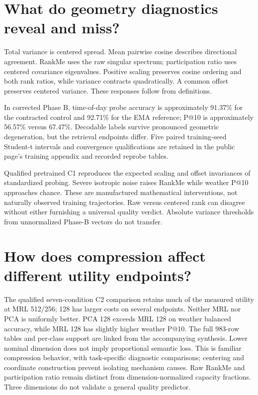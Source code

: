 \documentclass[11pt]{article}
\begin{document}
\section{What do geometry diagnostics reveal and miss?}
\established{} Total variance is centered spread. Mean pairwise cosine describes
directional agreement. RankMe \citep{garrido2023rankme} uses the raw singular spectrum; participation
ratio uses centered covariance eigenvalues. Positive scaling preserves cosine
ordering and both rank ratios, while variance contracts quadratically. A common
offset preserves centered variance. These responses follow from definitions.

\ours{} In corrected Phase B, time-of-day probe accuracy is approximately
91.37\% for the contracted control and 92.71\% for the EMA reference; P@10 is
approximately 56.57\% versus 67.47\%. Decodable labels survive pronounced
geometric degeneration, but the retrieval endpoints differ. Five paired
training-seed Student-t intervals and convergence qualifications are retained
in the public page's training appendix and recorded reprobe tables.

\ours{} Qualified pretrained C1 reproduces the expected scaling and offset
invariances of standardized probing. Severe isotropic noise raises RankMe while
weather P@10 approaches chance. \interp{} These are manufactured mathematical
interventions, not naturally observed training trajectories. Raw versus centered
rank can disagree without either furnishing a universal quality verdict.
Absolute variance thresholds from unnormalized Phase-B vectors do not transfer.



\section{How does compression affect different utility endpoints?}
\ours{} The qualified seven-condition C2 comparison retains much of the measured
utility at MRL 512/256; 128 has larger costs on several endpoints. Neither MRL
nor PCA is uniformly better. PCA 128 exceeds MRL 128 on weather balanced accuracy,
while MRL 128 has slightly higher weather P@10. The full 983-row tables and
per-class support are linked from the accompanying synthesis.
\interp{} Lower nominal dimension does not imply proportional semantic loss.
This is familiar compression behavior, with task-specific diagnostic comparisons;
centering and coordinate construction prevent isolating mechanism causes.
Raw RankMe and participation ratio remain distinct from dimension-normalized
capacity fractions. Three dimensions do not validate a general quality predictor.
\end{document}

